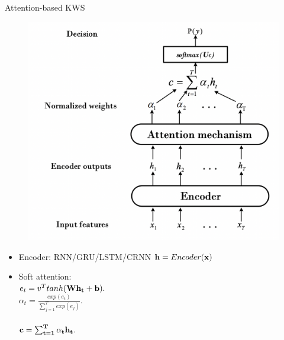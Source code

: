 \begin{frame}{Attention-based KWS}
    \begin{minipage}{0.55\textwidth}
        \begin{figure}
        	\centering
        	\includegraphics[width=0.95\linewidth]{figs/attention_kws.png}
        \end{figure}
    \end{minipage}%
    \hfill%
    \begin{minipage}{0.45\textwidth}
    \begin{itemize}
        \item Encoder: RNN/GRU/LSTM/CRNN
        ${\bf h}=Encoder({\bf x})$\\
        \item Soft attention: \\ 
        $e_{t}=v^{T}tanh(\bf W h_{t}+\bf b).$\\
        $\alpha_{t}=\frac{e x p(e_{t})}{\sum_{j=1}^{T}e x p(e_{j})}.$\\ \\
        $\bf c=\sum_{t=1}^{T}\alpha_{t}\bf h_{t}.$
    \end{itemize}
    \end{minipage}

\end{frame}
